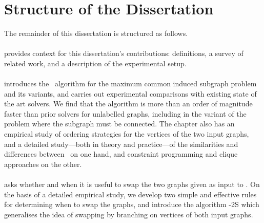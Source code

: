 \section{Structure of the Dissertation}

The remainder of this dissertation is structured as follows.

\paragraph*{} \hspace{-.8em} provides context for this dissertation's
contributions: definitions, a survey of related work, and a description of the
experimental setup.

\paragraph*{} \hspace{-.8em} introduces the \McSplit\
algorithm for the maximum common induced subgraph problem and its variants, and
carries out experimental comparisons with existing state of the art solvers.
We find that the algorithm is more than an order of magnitude faster than prior
solvers for unlabelled graphs, including in the variant of the problem
where the subgraph must be connected.
The chapter also has an empirical study of ordering strategies for the vertices
of the two input graphs, and a detailed study---both in theory and practice---of
the similarities and differences
between \McSplit\ on one hand, and constraint programming and clique approaches
on the other.


\paragraph*{} \hspace{-.8em} asks whether and when it is
useful to swap the two graphs given as input to \McSplit.
On the basis of a detailed empirical study,
we develop two
simple and effective rules for determining when to swap the graphs, and
introduce the algorithm \McSplit-2S which generalises the idea of swapping by branching on vertices of
both input graphs.

